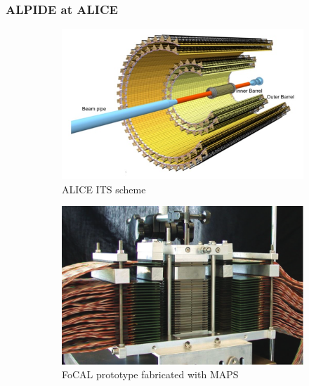         \subsubsection{ALPIDE at ALICE}
        \begin{figure}
            \centering
            \begin{subfigure}[b]{0.49\textwidth}
                \centering
                \includegraphics[width=\linewidth]{figures/pixel_detectors_usage/alice.png}        
                \caption{ALICE ITS scheme}
                \label{fig:ALICE_ITS}
            \end{subfigure}
            \hfill
            \begin{subfigure}[b]{0.49\textwidth}
                \centering
                \includegraphics[width=\linewidth]{figures/pixel_detectors_usage/ALICE_FoCAL.png}
                \caption{FoCAL prototype fabricated with MAPS}
                \label{fig:ALICE_FoCAL}
            \end{subfigure}
            \caption{}
            \label{fig:ALICE_RD}
       \end{figure}
        
